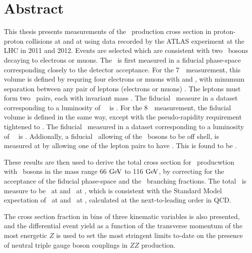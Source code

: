 \chapter*{Abstract}
This thesis presents measurements of the \ZZ\ production cross section in
proton-proton collisions at  and at  using data recorded
by the ATLAS experiment at the LHC in 2011 and 2012.  Events are selected which
are consistent with two \Z\ bosons decaying to electrons or muons. The \cx\ is
first measured in a fiducial phase-space corresponding closely to the detector
acceptance. For the 7~\tev\ measurement, this volume is defined by requring four
electrons or muons with  and , with minumum separation
between any pair of leptons (electrons or muons) . The leptons
must form two \ossf\ pairs, each with invariant mass \sstooos. The fiducial \cx\
measure in a dataset corresponding to a luminosity of
\LumiPassGRLTwentyEleven~\ifb\ is \ZZSevenTeVFiducialCrossSectionZZLLLL. For the
8~\tev\ measurement, the fiducial volume is defined in the same way, except with
the pseudo-rapidity requirement tightened to \modetalt{2.7}. The fiducial \cx\
measured in a dataset corresponding to a luminosity of
\LumiPassGRLTwentyTwelve~\ifb\ is \ZZEightTeVFiducialCrossSectionZZLLLL.
Addionally, a fiducial \cx\ allowing of the \Z\ bosons to be off shell, is
measured at \sqrtseq{7} by allowing one of the lepton pairs to have \mllgtt.
This is found to be \ZZSevenTeVFiducialCrossSectionZZsLLLL.

These results are then used to derive the total cross section for \ZZ\
producwtion with \Z\ bosons in the mass range 66$\GeV$ to 116$\GeV$, by
correcting for the acceptance of the fiducial phase-space and the \Zll\
branching fractions. The total \cx\ is measure to be
\ZZSevenTeVTotalCrossSection\ at \sqrtseq{7} and \ZZEightTeVTotalCrossSection\ at
\sqrtseq{8}, which is consistent with the Standard Model
expectation of \ZZSevenTeVTheoryTotalCrossSection\ at \sqrtseq{7} and \ZZEightTeVTheoryTotalCrossSection\ at
\sqrtseq{8}, calculated at the next-to-leading order in QCD.

The cross section fraction in bins of three kinematic variables is also presented, and 
the differential event yield as a function of the transverse momentum of the most energetic $Z$ 
is used to set the most stringent limits to-date on the presence of 
neutral triple gauge boson couplings in $ZZ$ production.
